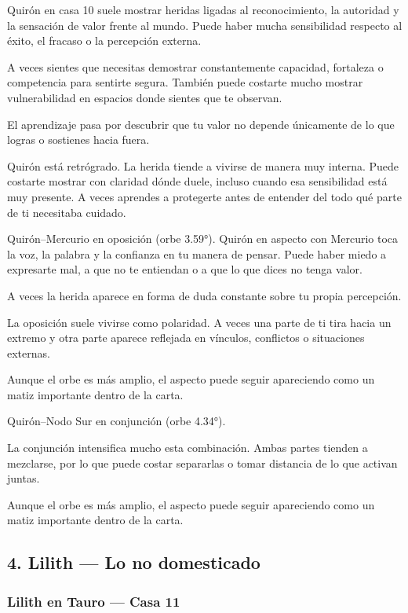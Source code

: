 \documentclass[11pt,a4paper]{article}
\begin{document}
Quirón en casa 10 suele mostrar heridas ligadas al reconocimiento, la autoridad y la sensación de valor frente al mundo. Puede haber mucha sensibilidad respecto al éxito, el fracaso o la percepción externa.

A veces sientes que necesitas demostrar constantemente capacidad, fortaleza o competencia para sentirte segura. También puede costarte mucho mostrar vulnerabilidad en espacios donde sientes que te observan.

El aprendizaje pasa por descubrir que tu valor no depende únicamente de lo que logras o sostienes hacia fuera.

Quirón está retrógrado. La herida tiende a vivirse de manera muy interna. Puede costarte mostrar con claridad dónde duele, incluso cuando esa sensibilidad está muy presente. A veces aprendes a protegerte antes de entender del todo qué parte de ti necesitaba cuidado.

Quirón–Mercurio en oposición (orbe 3.59°).
Quirón en aspecto con Mercurio toca la voz, la palabra y la confianza en tu manera de pensar. Puede haber miedo a expresarte mal, a que no te entiendan o a que lo que dices no tenga valor.

A veces la herida aparece en forma de duda constante sobre tu propia percepción.

La oposición suele vivirse como polaridad. A veces una parte de ti tira hacia un extremo y otra parte aparece reflejada en vínculos, conflictos o situaciones externas.

Aunque el orbe es más amplio, el aspecto puede seguir apareciendo como un matiz importante dentro de la carta.

Quirón–Nodo Sur en conjunción (orbe 4.34°).


La conjunción intensifica mucho esta combinación. Ambas partes tienden a mezclarse, por lo que puede costar separarlas o tomar distancia de lo que activan juntas.

Aunque el orbe es más amplio, el aspecto puede seguir apareciendo como un matiz importante dentro de la carta.

\vspace{0.4cm}

\subsection{4. Lilith — Lo no domesticado}

\subsubsection*{Lilith en Tauro — Casa 11}
\end{document}
